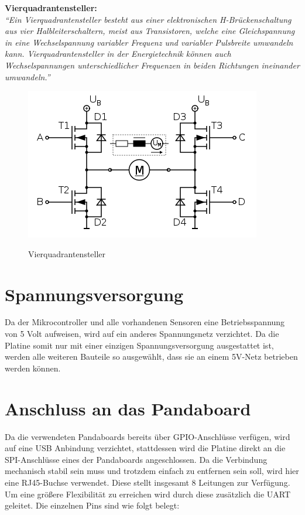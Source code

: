 \begin{minipage}{0.9\textwidth}
\textbf{Vierquadrantensteller:\\}
\emph{``Ein Vierquadrantensteller besteht aus einer elektronischen H-Brückenschaltung aus vier Halbleiterschaltern, meist aus Transistoren, 
welche eine Gleichspannung in eine Wechselspannung variabler Frequenz und variabler Pulsbreite umwandeln kann. Vierquadrantensteller 
in der Energietechnik können auch Wechselspannungen unterschiedlicher Frequenzen in beiden Richtungen ineinander umwandeln.''}\cite{vierquadrantensteller}
\end{minipage}

\begin{figure}[H]
\centering
\includegraphics[width=.8\textwidth]{Vierquadrantensteller.png}\\
\caption{Vierquadrantensteller \cite{vierquadrantensteller}}%
\label{fig:Vierquadrantensteller2}
\end{figure}

\section{Spannungsversorgung}
Da der Mikrocontroller und alle vorhandenen Sensoren eine Betriebs\-spannung von 5 Volt aufweisen, wird auf ein anderes Spannungsnetz verzichtet.
Da die Platine somit nur mit einer einzigen Spannungsversorgung ausgestattet ist, werden alle weiteren Bauteile so ausgewählt, dass sie 
an einem 5V-Netz betrieben werden können.

\section{Anschluss an das Pandaboard}
Da die verwendeten Panda\-boards bereits über GPIO-Anschlüsse ver\-fü\-gen, wird auf eine USB Anbindung verzichtet, stattdessen wird die Platine direkt an die SPI-Anschlüsse
eines der Pandaboards angeschlossen. Da die Verbindung mechanisch stabil sein muss und trotzdem einfach zu entfernen sein soll, wird hier eine RJ45-Buchse verwendet.
Diese stellt insgesamt 8 Leitungen zur Verfügung. Um eine größere Flexibilität zu erreichen wird durch diese zusätzlich die UART geleitet.
Die einzelnen Pins sind wie folgt belegt:

